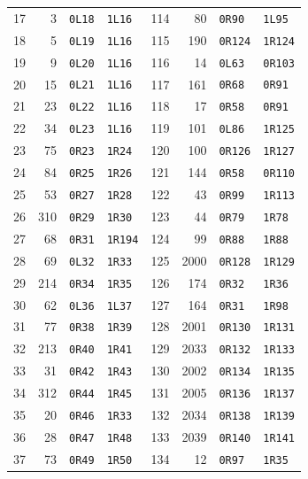 \begin{longtable}{rrll@{\qquad}rrll}
17 & 3 & \texttt{0L18} & \texttt{1L16} & 114 & 80 & \texttt{0R90} & \texttt{1L95}\\
18 & 5 & \texttt{0L19} & \texttt{1L16} & 115 & 190 & \texttt{0R124} & \texttt{1R124}\\
19 & 9 & \texttt{0L20} & \texttt{1L16} & 116 & 14 & \texttt{0L63} & \texttt{0R103}\\
20 & 15 & \texttt{0L21} & \texttt{1L16} & 117 & 161 & \texttt{0R68} & \texttt{0R91}\\
21 & 23 & \texttt{0L22} & \texttt{1L16} & 118 & 17 & \texttt{0R58} & \texttt{0R91}\\
22 & 34 & \texttt{0L23} & \texttt{1L16} & 119 & 101 & \texttt{0L86} & \texttt{1R125}\\
23 & 75 & \texttt{0R23} & \texttt{1R24} & 120 & 100 & \texttt{0R126} & \texttt{1R127}\\
24 & 84 & \texttt{0R25} & \texttt{1R26} & 121 & 144 & \texttt{0R58} & \texttt{0R110}\\
25 & 53 & \texttt{0R27} & \texttt{1R28} & 122 & 43 & \texttt{0R99} & \texttt{1R113}\\
26 & 310 & \texttt{0R29} & \texttt{1R30} & 123 & 44 & \texttt{0R79} & \texttt{1R78}\\
27 & 68 & \texttt{0R31} & \texttt{1R194} & 124 & 99 & \texttt{0R88} & \texttt{1R88}\\
28 & 69 & \texttt{0L32} & \texttt{1R33} & 125 & 2000 & \texttt{0R128} & \texttt{1R129}\\
29 & 214 & \texttt{0R34} & \texttt{1R35} & 126 & 174 & \texttt{0R32} & \texttt{1R36}\\
30 & 62 & \texttt{0L36} & \texttt{1L37} & 127 & 164 & \texttt{0R31} & \texttt{1R98}\\
31 & 77 & \texttt{0R38} & \texttt{1R39} & 128 & 2001 & \texttt{0R130} & \texttt{1R131}\\
32 & 213 & \texttt{0R40} & \texttt{1R41} & 129 & 2033 & \texttt{0R132} & \texttt{1R133}\\
33 & 31 & \texttt{0R42} & \texttt{1R43} & 130 & 2002 & \texttt{0R134} & \texttt{1R135}\\
34 & 312 & \texttt{0R44} & \texttt{1R45} & 131 & 2005 & \texttt{0R136} & \texttt{1R137}\\
35 & 20 & \texttt{0R46} & \texttt{1R33} & 132 & 2034 & \texttt{0R138} & \texttt{1R139}\\
36 & 28 & \texttt{0R47} & \texttt{1R48} & 133 & 2039 & \texttt{0R140} & \texttt{1R141}\\
37 & 73 & \texttt{0R49} & \texttt{1R50} & 134 & 12 & \texttt{0R97} & \texttt{1R35}\\

\end{longtable}
